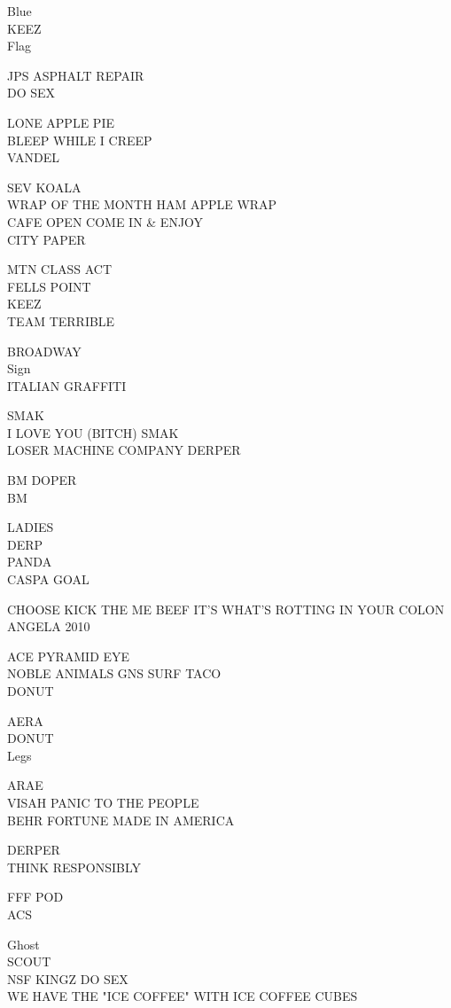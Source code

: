 \documentclass[10pt,letterpaper]{article}
\begin{document}
Blue\\
KEEZ\\
Flag

JPS ASPHALT REPAIR\\
DO SEX

LONE APPLE PIE\\
BLEEP WHILE I CREEP\\
VANDEL

SEV KOALA\\
WRAP OF THE MONTH HAM APPLE WRAP\\
CAFE OPEN COME IN \& ENJOY\\
CITY PAPER

MTN CLASS ACT\\
FELLS POINT\\
KEEZ\\
TEAM TERRIBLE

BROADWAY\\
Sign\\
ITALIAN GRAFFITI

SMAK\\
I LOVE YOU (BITCH) SMAK\\
LOSER MACHINE COMPANY DERPER

BM DOPER\\
BM

LADIES\\
DERP\\
PANDA\\
CASPA GOAL

CHOOSE KICK THE ME BEEF IT'S WHAT'S ROTTING IN YOUR COLON\\
ANGELA 2010

ACE PYRAMID EYE\\
NOBLE ANIMALS GNS SURF TACO\\
DONUT

AERA\\
DONUT\\
Legs

ARAE\\
VISAH PANIC TO THE PEOPLE\\
BEHR FORTUNE MADE IN AMERICA

DERPER\\
THINK RESPONSIBLY

FFF POD\\
ACS

Ghost\\
SCOUT\\
NSF KINGZ DO SEX\\
WE HAVE THE "ICE COFFEE" WITH ICE COFFEE CUBES
\end{document}
